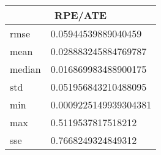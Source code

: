 \begin{table}[!ht] 
 \centering 
 \begin{tabular}{|l|l|} \hline 
 \multicolumn{2}{|c|}{RPE/ATE} \\ \hline 
 rmse & 0.05944539889040459 \\ \hline 
mean & 0.028883245884769787 \\ \hline 
median & 0.016869983488900175 \\ \hline 
std & 0.051956843210488095 \\ \hline 
min & 0.0009225149939304381 \\ \hline 
max & 0.5119537817518212 \\ \hline 
sse & 0.7668249324849312 \\ \hline 
\end{tabular} 
 \end{table}